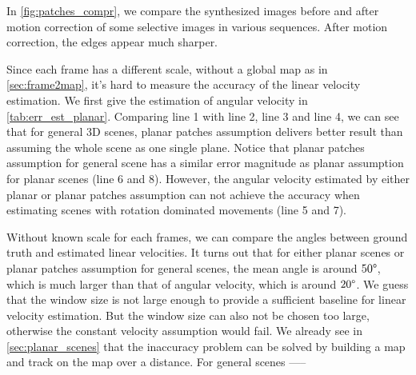 In \cref{fig:patches_compr}, we compare the synthesized images before
and after motion correction of some selective images in various
sequences. After motion correction, the edges appear much sharper.

Since each frame has a different scale, without a global map as in
\cref{sec:frame2map}, it's hard to measure the accuracy of the linear
velocity estimation. We first give the estimation of angular velocity
in \cref{tab:err_est_planar}. Comparing line 1 with line 2, line 3 and
line 4, we can see that for general 3D scenes, planar patches
assumption delivers better result than assuming the whole scene as one
single plane. Notice that planar patches assumption for general scene
has a similar error magnitude as planar assumption for planar scenes
(line 6 and 8). However, the angular velocity estimated by either
planar or planar patches assumption can not achieve the accuracy when
estimating scenes with rotation dominated movements (line 5 and 7).

Without known scale for each frames, we can compare the angles between
ground truth and estimated linear velocities. It turns out that for
either planar scenes or planar patches assumption for general scenes,
the mean angle is around $50\degree$, which is much larger than that
of angular velocity, which is around $20\degree$. We guess that the
window size is not large enough to provide a sufficient baseline for
linear velocity estimation. But the window size can also not be chosen
too large, otherwise the constant velocity assumption would fail. We
already see in \cref{sec:planar_scenes} that the inaccuracy problem
can be solved by building a map and track on the map over a
distance. For general scenes -----

